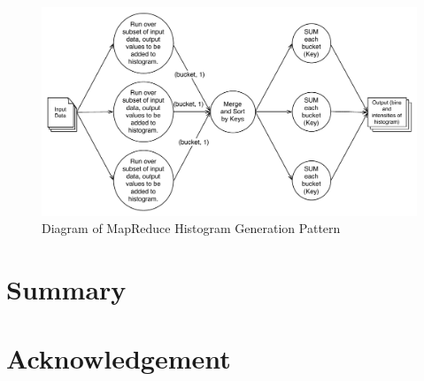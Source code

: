 \documentclass[article]{jss}
\begin{document}
\begin{figure}[h!]
\begin{center}
\includegraphics[width=\textwidth]{histogram-mapreduce-diag1.pdf}
\end{center}
\caption{Diagram of MapReduce Histogram Generation Pattern}
\label{fig:mr-histogram-pattern1}
\end{figure}

%



\section{Summary}




\section{Acknowledgement}
\end{document}
